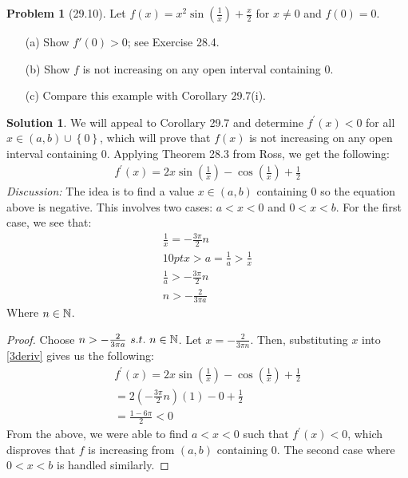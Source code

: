 \documentclass[12pt]{article}
\theoremstyle{definition} %
\newtheorem{solution}{Solution}
\newtheorem{problem}{Problem}
\theoremstyle{plain} %
\begin{document}
\begin{problem}[29.10]
    Let $ f(x) = x^2 \sin\left(\frac{1}{x}\right) + \frac{x}{2} $ for $ x \neq 0 $ and $ f(0) = 0 $.

\begin{enumerate}
    \item[(a)] Show $ f'(0) > 0 $; see Exercise 28.4.
    \item[(b)] Show $ f $ is not increasing on any open interval containing 0.
    \item[(c)] Compare this example with Corollary 29.7(i).
\end{enumerate}
\end{problem}
\begin{solution}
   We will appeal to Corollary 29.7 and determine $f^\prime (x)<0$ for all $x\in (a,b)\cup \left\{ 0 \right\}$, which will prove that $f(x)$ is not increasing on any open interval containing $0$. Applying Theorem 28.3 from Ross, we get the following:
   \begin{align}
    f^\prime (x)=2x\sin \left( \frac{1}{x} \right) -\cos\left( \frac{1}{x} \right) +\frac{1}{2} \label{3deriv}
   \end{align} 
\emph{Discussion:} The idea is to find a value $x \in (a,b)$ containing $0$ so the equation above is negative. This involves two cases: $a<x<0$ and $0<x<b$. For the first case, we see that:
\begin{align}
    \frac{1}{x} = -\frac{3\pi}{2}n \\10pt
    x>a = \frac{1}{a}>\frac{1}{x} \\[10pt] 
    \frac{1}{a}> -\frac{3\pi}{2}n \\[10pt] 
    n > -\frac{2}{3\pi a}
\end{align}
Where $n\in \mathbb{\MakeUppercase{n}} $. 
\begin{proof}
    Choose $n> -\frac{2}{3\pi a} \ s.t. \ n\in \mathbb{\MakeUppercase{n}} $. Let $x = -\frac{2}{3\pi n}$. Then, substituting $x$ into \autoref{3deriv} gives us the following:
    \begin{align}
        f^\prime (x)=2x\sin \left( \frac{1}{x} \right) -\cos\left( \frac{1}{x} \right) +\frac{1}{2} \\[10pt] 
        = 2\left( -\frac{3\pi}{2}n \right)\left( 1 \right) - 0 + \frac{1}{2}  \\[10pt] 
        = \frac{1-6\pi}{2}<0
    \end{align}
    From the above, we were able to find $a<x<0$ such that $f^\prime (x)<0$, which disproves that $f$ is increasing from $(a,b)$ containing $0$. The second case where $0<x<b$ is handled similarly.
\end{proof}
\end{solution}
\end{document}
